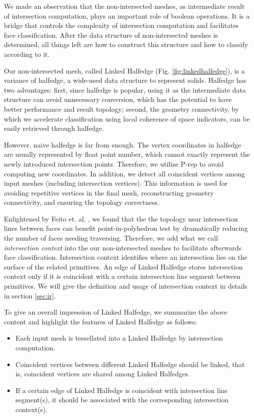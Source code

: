 \documentclass[10pt,journal,compsoc]{IEEEtran}
\begin{document}
\label{sec:meshes}
We made an observation that the non-intersected meshes, as intermediate result of intersection computation, plays an important role of boolean operations. It is a bridge that controls the complexity of intersection computation and facilitates face classification. After the data structure of non-intersected meshes is determined, all things left are how to construct this structure and how to classify according to it.

Our non-intersected mesh, called Linked Halfedge (Fig. \ref{fig:linkedhalfedge}), is a variance of halfedge, a wide-used data structure to represent solids. Halfedge has two advantages: first, since halfedge is popular, using it as the intermediate data structure can avoid unnecessary conversion, which has the potential to have better performance and result topology; second, the geometry connectivity, by which we accelerate classification using local coherence of space indicators, can be easily retrieved through halfedge.

However, naive halfedge is far from enough. The vertex coordinates in halfedge are usually represented by float point number, which cannot exactly represent the newly introduced intersection points. Therefore, we utilize P-rep to avoid computing new coordinates. In addition, we detect all coincident vertices among input meshes (including intersection vertices). This information is used for avoiding repetitive vertices in the final mesh, reconstructing geometry connectivity, and ensuring the topology correctness.

Enlightened by Feito et. al. \cite{feito2013fast}, we found that the the topology near intersection lines between faces can benefit point-in-polyhedron test by dramatically reducing the number of faces needing traversing. Therefore, we add what we call \emph{intersection context} into the our non-intersected meshes to facilitate afterwards face classification. Intersection context identifies where an intersection lies on the surface of the related primitives. An edge of Linked Halfedge stores intersection context only if it is coincident with a certain intersection line segment between primitives. We will give the definition and usage of intersection context in details in section \ref{sec:ir}.

To give an overall impression of Linked Halfedge, we summarize the above content and highlight the features of Linked Halfedge as follows:

\begin{itemize}
  \item Each input mesh is tessellated into a Linked Halfedge by intersection computation.
  \item Coincident vertices between different Linked Halfedge should be linked, that is, coincident vertices are shared among Linked Halfedges.
  \item If a certain edge of Linked Halfedge is coincident with intersection line segment(s), it should be associated with the corresponding intersection context(s).
\end{itemize}
\end{document}
